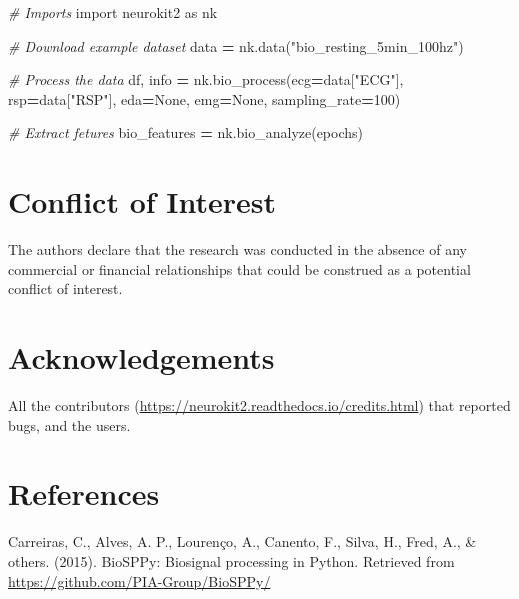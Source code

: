\documentclass[
  english,
  man,floatsintext]{apa6}
\newenvironment{Shaded}{\begin{snugshade}}{\end{snugshade}}
\newcommand{\CommentTok}[1]{\textcolor[rgb]{0.56,0.35,0.01}{\textit{#1}}}
\newcommand{\DecValTok}[1]{\textcolor[rgb]{0.00,0.00,0.81}{#1}}
\newcommand{\ImportTok}[1]{#1}
\newcommand{\NormalTok}[1]{#1}
\newcommand{\OperatorTok}[1]{\textcolor[rgb]{0.81,0.36,0.00}{\textbf{#1}}}
\newcommand{\StringTok}[1]{\textcolor[rgb]{0.31,0.60,0.02}{#1}}
\newcommand{\VariableTok}[1]{\textcolor[rgb]{0.00,0.00,0.00}{#1}}
\begin{document}
\begin{Shaded}
\begin{Highlighting}[]
\CommentTok{# Imports}
\ImportTok{import}\NormalTok{ neurokit2 }\ImportTok{as}\NormalTok{ nk}

\CommentTok{# Download example dataset}
\NormalTok{data }\OperatorTok{=}\NormalTok{ nk.data(}\StringTok{"bio_resting_5min_100hz"}\NormalTok{)}

\CommentTok{# Process the data}
\NormalTok{df, info }\OperatorTok{=}\NormalTok{ nk.bio_process(ecg}\OperatorTok{=}\NormalTok{data[}\StringTok{"ECG"}\NormalTok{], rsp}\OperatorTok{=}\NormalTok{data[}\StringTok{"RSP"}\NormalTok{], eda}\OperatorTok{=}\VariableTok{None}\NormalTok{, emg}\OperatorTok{=}\VariableTok{None}\NormalTok{, sampling_rate}\OperatorTok{=}\DecValTok{100}\NormalTok{)}

\CommentTok{# Extract fetures}
\NormalTok{bio_features }\OperatorTok{=}\NormalTok{ nk.bio_analyze(epochs)}
\end{Highlighting}
\end{Shaded}

\hypertarget{conflict-of-interest}{%
\section{Conflict of Interest}\label{conflict-of-interest}}

The authors declare that the research was conducted in the absence of any commercial or financial relationships that could be construed as a potential conflict of interest.

\hypertarget{acknowledgements}{%
\section{Acknowledgements}\label{acknowledgements}}

All the contributors (\url{https://neurokit2.readthedocs.io/credits.html}) that reported bugs, and the users.

\newpage

\hypertarget{references}{%
\section{References}\label{references}}

\begingroup
\setlength{\parindent}{-0.5in}
\setlength{\leftskip}{0.5in}

\hypertarget{refs}{}
\leavevmode\hypertarget{ref-biosppy}{}%
Carreiras, C., Alves, A. P., Lourenço, A., Canento, F., Silva, H., Fred, A., \& others. (2015). BioSPPy: Biosignal processing in Python. Retrieved from \url{https://github.com/PIA-Group/BioSPPy/}
\end{document}
